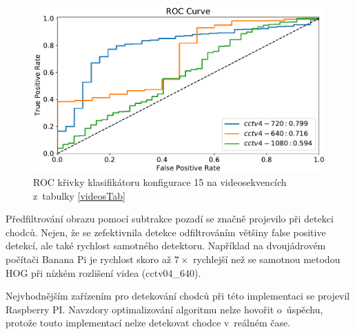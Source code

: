 \begin{figure}[H]
\centering
\includegraphics[width=16cm]{figures/roc2.pdf}
\caption{ROC křivky klasifikátoru konfigurace 15 na videosekvencích z~tabulky \ref{videosTab}}
\label{fig:rocCurve2}
\end{figure}

Předfiltrování obrazu pomocí subtrakce pozadí se značně projevilo při detekci chodců. Nejen, že se zefektivnila detekce odfiltrováním většiny false positive detekcí, ale také rychlost samotného detektoru. Například na dvoujádrovém počítači Banana Pi je rychlost skoro až $7\times$ rychlejší než se samotnou metodou HOG při nízkém rozlišení videa (cctv04\_640).

Nejvhodnějším zařízením pro detekování chodců při této implementaci se projevil Raspberry PI. Navzdory optimalizování algoritmu nelze hovořit o~úspěchu, protože touto implementací nelze detekovat chodce v~reálném čase.